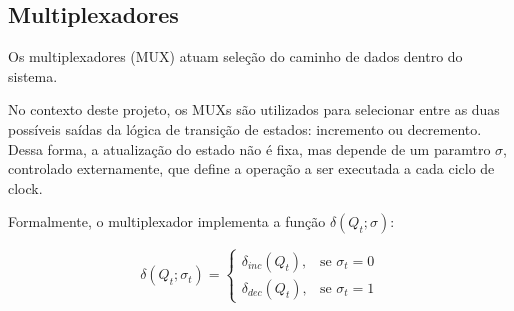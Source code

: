 \subsection{Multiplexadores}

Os multiplexadores (MUX) atuam seleção do caminho de dados dentro do sistema.

No contexto deste projeto, os MUXs são utilizados para selecionar entre as duas possíveis saídas da lógica de transição de estados: incremento ou decremento. Dessa forma, a atualização do estado não é fixa, mas depende de um paramtro $\sigma$, controlado externamente, que define a operação a ser executada a cada ciclo de clock.

Formalmente, o multiplexador implementa a função $\delta(Q_t; \sigma)$:

\[
\delta(Q_t; \sigma_t) = 
\begin{cases}
\delta_{inc}(Q_t), & \text{se } \sigma_t = 0 \\
\delta_{dec}(Q_t), & \text{se } \sigma_t = 1
\end{cases}
\]
